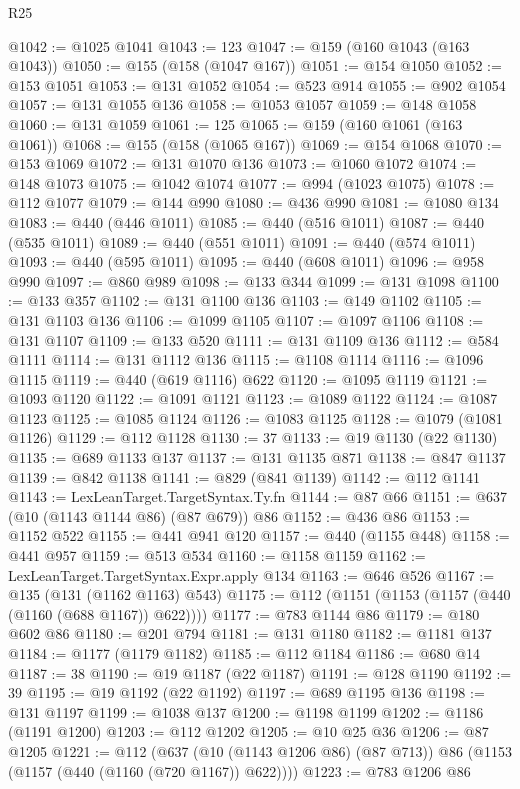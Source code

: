 \begin{lexlean}{R25}
\begin{coremodule}
@1042 := @1025 @1041
@1043 := 123
@1047 := @159 (@160 @1043 (@163 @1043))
@1050 := @155 (@158 (@1047 @167))
@1051 := @154 @1050
@1052 := @153 @1051
@1053 := @131 @1052
@1054 := @523 @914
@1055 := @902 @1054
@1057 := @131 @1055 @136
@1058 := @1053 @1057
@1059 := @148 @1058
@1060 := @131 @1059
@1061 := 125
@1065 := @159 (@160 @1061 (@163 @1061))
@1068 := @155 (@158 (@1065 @167))
@1069 := @154 @1068
@1070 := @153 @1069
@1072 := @131 @1070 @136
@1073 := @1060 @1072
@1074 := @148 @1073
@1075 := @1042 @1074
@1077 := @994 (@1023 @1075)
@1078 := @112 @1077
@1079 := @144 @990
@1080 := @436 @990
@1081 := @1080 @134
@1083 := @440 (@446 @1011)
@1085 := @440 (@516 @1011)
@1087 := @440 (@535 @1011)
@1089 := @440 (@551 @1011)
@1091 := @440 (@574 @1011)
@1093 := @440 (@595 @1011)
@1095 := @440 (@608 @1011)
@1096 := @958 @990
@1097 := @860 @989
@1098 := @133 @344
@1099 := @131 @1098
@1100 := @133 @357
@1102 := @131 @1100 @136
@1103 := @149 @1102
@1105 := @131 @1103 @136
@1106 := @1099 @1105
@1107 := @1097 @1106
@1108 := @131 @1107
@1109 := @133 @520
@1111 := @131 @1109 @136
@1112 := @584 @1111
@1114 := @131 @1112 @136
@1115 := @1108 @1114
@1116 := @1096 @1115
@1119 := @440 (@619 @1116) @622
@1120 := @1095 @1119
@1121 := @1093 @1120
@1122 := @1091 @1121
@1123 := @1089 @1122
@1124 := @1087 @1123
@1125 := @1085 @1124
@1126 := @1083 @1125
@1128 := @1079 (@1081 @1126)
@1129 := @112 @1128
@1130 := 37
@1133 := @19 @1130 (@22 @1130)
@1135 := @689 @1133 @137
@1137 := @131 @1135 @871
@1138 := @847 @1137
@1139 := @842 @1138
@1141 := @829 (@841 @1139)
@1142 := @112 @1141
@1143 := LexLeanTarget.TargetSyntax.Ty.fn
@1144 := @87 @66
@1151 := @637 (@10 (@1143 @1144 @86) (@87 @679)) @86
@1152 := @436 @86
@1153 := @1152 @522
@1155 := @441 @941 @120
@1157 := @440 (@1155 @448)
@1158 := @441 @957
@1159 := @513 @534
@1160 := @1158 @1159
@1162 := LexLeanTarget.TargetSyntax.Expr.apply @134
@1163 := @646 @526
@1167 := @135 (@131 (@1162 @1163) @543)
@1175 := @112 (@1151 (@1153 (@1157 (@440 (@1160 (@688 @1167)) @622))))
@1177 := @783 @1144 @86
@1179 := @180 @602 @86
@1180 := @201 @794
@1181 := @131 @1180
@1182 := @1181 @137
@1184 := @1177 (@1179 @1182)
@1185 := @112 @1184
@1186 := @680 @14
@1187 := 38
@1190 := @19 @1187 (@22 @1187)
@1191 := @128 @1190
@1192 := 39
@1195 := @19 @1192 (@22 @1192)
@1197 := @689 @1195 @136
@1198 := @131 @1197
@1199 := @1038 @137
@1200 := @1198 @1199
@1202 := @1186 (@1191 @1200)
@1203 := @112 @1202
@1205 := @10 @25 @36
@1206 := @87 @1205
@1221 := @112
    (@637 (@10 (@1143 @1206 @86) (@87 @713)) @86 (@1153 (@1157 (@440 (@1160 (@720 @1167)) @622))))
@1223 := @783 @1206 @86

\end{coremodule}
\end{lexlean}

